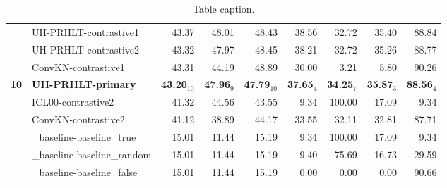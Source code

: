 \begin{table*}[tbh]
\begin{center}
\begin{tabular}{clrrrrrrr}
& UH-PRHLT-contrastive1 & 43.37 & \scriptsize 48.01 & \scriptsize 48.43 & \scriptsize 38.56 & \scriptsize 32.72 & \scriptsize 35.40 & \scriptsize 88.84 \\
& UH-PRHLT-contrastive2 & 43.32 & \scriptsize 47.97 & \scriptsize 48.45 & \scriptsize 38.21 & \scriptsize 32.72 & \scriptsize 35.26 & \scriptsize 88.77 \\
& ConvKN-contrastive1 & 43.31 & \scriptsize 44.19 & \scriptsize 48.89 & \scriptsize 30.00 & \scriptsize  3.21 & \scriptsize  5.80 & \scriptsize 90.26 \\
\bf 10 & \bf UH-PRHLT-primary & \bf 43.20$_{10}$ & \bf \scriptsize 47.96$_{9}$ & \bf \scriptsize 47.79$_{10}$ & \bf \scriptsize 37.65$_{4}$ & \bf \scriptsize 34.25$_{7}$ & \bf \scriptsize 35.87$_{3}$ & \bf \scriptsize 88.56$_{4}$ \\
& ICL00-contrastive2 & 41.32 & \scriptsize 44.56 & \scriptsize 43.55 & \scriptsize  9.34 & \scriptsize 100.00 & \scriptsize 17.09 & \scriptsize  9.34 \\
& ConvKN-contrastive2 & 41.12 & \scriptsize 38.89 & \scriptsize 44.17 & \scriptsize 33.55 & \scriptsize 32.11 & \scriptsize 32.81 & \scriptsize 87.71 \\
& \_baseline-baseline\_true & 15.01 & \scriptsize 11.44 & \scriptsize 15.19 & \scriptsize  9.34 & \scriptsize 100.00 & \scriptsize 17.09 & \scriptsize  9.34 \\
& \_baseline-baseline\_random & 15.01 & \scriptsize 11.44 & \scriptsize 15.19 & \scriptsize  9.40 & \scriptsize 75.69 & \scriptsize 16.73 & \scriptsize 29.59 \\
& \_baseline-baseline\_false & 15.01 & \scriptsize 11.44 & \scriptsize 15.19 & \scriptsize  0.00 & \scriptsize  0.00 & \scriptsize  0.00 & \scriptsize 90.66 \\
\end{tabular}
\caption{Table caption.}
\label{table:results}
\end{center}
\end{table*}
